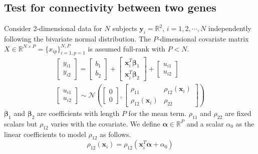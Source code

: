 \documentclass[aap,authoryear, preprint]{imsart}
\numberwithin{equation}{section}
\theoremstyle{plain}
\begin{document}
\subsection{Test for connectivity between two genes \label{sec:framework2}}
Consider 2-dimensional data for $N$ subjects $\bm{y}_i = \mathbb{R}^2$, $i = 1, 2, \cdots, N$ independently following the bivariate normal distribution. The $P$-dimensional covariate matrix $X \in \mathbb{R}^{N \times P} = \{x_{ip}\}_{i=1,p=1}^{N,P}$ is assumed full-rank with $P < N$.
\begin{equation}
\begin{multlined}
    \begin{bmatrix} y_{i1} \\ y_{i2} \end{bmatrix} = 
    \begin{bmatrix} b_{1} \\ b_{2} \end{bmatrix} + 
    \begin{bmatrix} \bm{x}_i^T \bm{\beta}_1 \\ \bm{x}_i^T \bm{\beta}_2 \end{bmatrix} + 
    \begin{bmatrix} {u_{i1}} \\ {u_{i2}} \end{bmatrix}\\
    \begin{bmatrix} {u_{i1}} \\ u_{i2} \end{bmatrix} 
    \sim \mathcal{N}\left(
        \begin{bmatrix} 0 \\ 0 \end{bmatrix}, 
        \begin{bmatrix} \rho_{11} & \rho_{12}(\bm{x}_i) \\ 
        \rho_{12}(\bm{x}_i) & \rho_{22} \end{bmatrix}
    \right)
    \end{multlined}
    \label{eq:framework_2genes}
\end{equation}
$\bm{\beta}_1$ and $\bm{\beta}_2$ are coefficients with length $P$  for the mean term. $\rho_{11}$ and $\rho_{22}$ are fixed scalars but $\rho_{12}$ varies with the covariate. We define $\bm{\alpha} \in \mathbb{R}^{P}$ and a scalar $\alpha_0$ as the linear coefficients to model $\rho_{12}$ as follows.
\begin{equation}
    \rho_{12}(\bm{x}_i) = \rho_{12}(\bm{x}_i^T\bm{\alpha} + \alpha_0) \label{eq:rho}
\end{equation}
\end{document}
